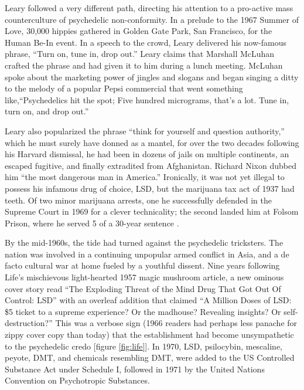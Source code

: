 \documentclass{UIdahoMastersThesis}
\begin{document}
Leary followed a very different path, directing his attention to a pro-active mass counterculture of psychedelic non-conformity. In a prelude to the 1967 Summer of Love, 30,000 hippies gathered in Golden Gate Park, San Francisco, for the Human Be-In event. In a speech to the crowd, Leary delivered his now-famous phrase, ``Turn on, tune in, drop out.'' Leary claims that Marshall McLuhan crafted the phrase and had given it to him during a lunch meeting. McLuhan spoke about the marketing power of jingles and slogans and began singing a ditty to the melody of a popular Pepsi commercial that went something like,\enquote{Psychedelics hit the spot; Five hundred micrograms, that's a lot. Tune in, turn on, and drop out.}

Leary also popularized the phrase ``think for yourself and question authority,'' which he must surely have donned as a mantel, for over the two decades following his Harvard dismissal, he had been in dozens of jails on multiple continents, an escaped fugitive, and finally extradited from Afghanistan. Richard Nixon dubbed him ``the most dangerous man in America.'' Ironically, it was not yet illegal to possess his infamous drug of choice, LSD, but the marijuana tax act of 1937 had teeth. Of two minor marijuana arrests, one he successfully defended in the Supreme Court in 1969 for a clever technicality; the second landed him at Folsom Prison, where he served 5 of a 30-year sentence \cite{higgs_i_2006}.

By the mid-1960s, the tide had turned against the psychedelic tricksters. The nation was involved in a continuing unpopular armed conflict in Asia, and a de facto cultural war at home fueled by a youthful dissent. Nine years following Life's mischievous light-hearted 1957 magic mushroom article, a new ominous cover story read \enquote{The Exploding Threat of the Mind Drug That Got Out Of Control: LSD} with an overleaf addition that claimed \enquote{A Million Doses of LSD: \$5 ticket to a supreme experience? Or the madhouse? Revealing insights? Or self-destruction?} This was a verbose sign (1966 readers had perhaps less panache for zippy cover copy than today) that the establishment had become unsympathetic to the psychedelic credo [figure \ref{fig:life}]. In 1970, LSD, psilocybin, mescaline, peyote, DMT, and chemicals resembling DMT, were added to the US Controlled Substance Act under Schedule I, followed in 1971 by the United Nations Convention on Psychotropic Substances. 
\end{document}

